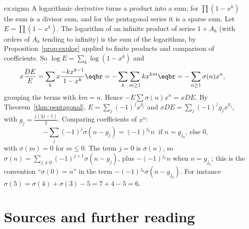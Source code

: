 \begin{solution}{ex:sigma}
\idea A logarithmic derivative turns a product into a sum; for $\prod(1-x^k)$ the sum is a divisor sum, and for the
pentagonal series it is a sparse sum.
\writeup Let $E=\prod(1-x^k)$. The logarithm of an infinite product of series $1+A_k$ (with orders of $A_k$ tending to
infinity) is the sum of the logarithms, by Proposition~\ref{prop:explog} applied to finite products and comparison of
coefficients. So $\log E=\sum_k\log(1-x^k)$ and
\[
\begin{aligned}x\frac{DE}E&=\sum_kx\frac{-kx^{k-1}}{1-x^k}\eqbr=-\sum_k\sum_{m\ge1}kx^{km}\eqbr=-\sum_{n\ge1}\sigma(n)x^n,\end{aligned}
\]
grouping the terms with $km=n$. Hence $-E\sum\sigma(n)x^n=xDE$. By Theorem~\ref{thm:pentagonal}, $E=\sum_j(-1)^jx^{g_j}$ and
$xDE=\sum_j(-1)^jg_jx^{g_j}$, with $g_j=\frac{j(3j-1)}2$. Comparing coefficients of $x^n$:
\[
-\sum_j(-1)^j\sigma(n-g_j)=(-1)^{j_0}n\ \text{ if }n=g_{j_0},\ \text{else }0,
\]
with $\sigma(m)=0$ for $m\le0$. The term $j=0$ is $\sigma(n)$, so $\sigma(n)=\sum_{j\ne0}(-1)^{j+1}\sigma(n-g_j)$, plus $-(-1)^{j_0}n$
when $n=g_{j_0}$; this is the convention ``$\sigma(0)=n$'' in the term $-(-1)^{j_0}\sigma(n-g_{j_0})$. For instance $\sigma(5)=\sigma(4)+\sigma(3)-5=7+4-5=6$.
\end{solution}

\section*{Sources and further reading}

